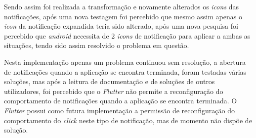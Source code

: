 Sendo assim foi realizada a transformação e novamente alterados os \textit{icons} das notificações, após uma nova testagem foi percebido que mesmo assim apenas o \textit{icon} da notificação expandida teria sido alterado, após uma nova pesquisa foi percebido que \textit{android} necessita de 2 \textit{icons} de notificação para aplicar a ambas as situações, tendo sido assim resolvido o problema em questão.

Nesta implementação apenas um problema continuou sem resolução, a abertura de notificações quando a aplicação se encontra terminada, foram testadas várias soluções, mas após a leitura de documentação e de soluções de outros utilizadores, foi percebido que o \textit{Flutter} não permite a reconfiguração do comportamento de notificações quando a aplicação se encontra terminada. O \textit{Flutter} possui como futura implementação a permissão de reconfiguração do comportamento do \textit{click} neste tipo de notificação, mas de momento não dispõe de solução.